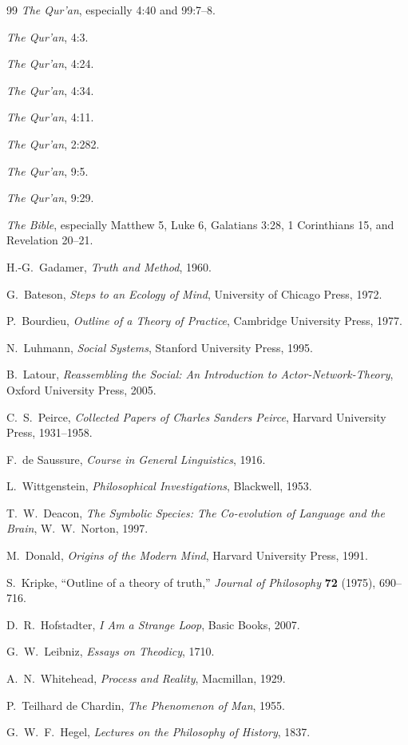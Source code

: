 \documentclass[11pt]{article}
\theoremstyle{remark}
\theoremstyle{plain}
\begin{document}
\begin{thebibliography}{99}
\emph{The Qur'an},
especially 4:40 and 99:7--8.

\emph{The Qur'an}, 4:3.

\emph{The Qur'an}, 4:24.

\emph{The Qur'an}, 4:34.

\emph{The Qur'an}, 4:11.

\emph{The Qur'an}, 2:282.

\emph{The Qur'an}, 9:5.

\emph{The Qur'an}, 9:29.

\emph{The Bible},
especially Matthew 5, Luke 6, Galatians 3:28, 1 Corinthians 15, and
Revelation 20--21.

H.-G.\ Gadamer,
\emph{Truth and Method},
1960.

G.\ Bateson,
\emph{Steps to an Ecology of Mind},
University of Chicago Press, 1972.

P.\ Bourdieu,
\emph{Outline of a Theory of Practice},
Cambridge University Press, 1977.

N.\ Luhmann,
\emph{Social Systems},
Stanford University Press, 1995.

B.\ Latour,
\emph{Reassembling the Social: An Introduction to Actor-Network-Theory},
Oxford University Press, 2005.

C.\ S.\ Peirce,
\emph{Collected Papers of Charles Sanders Peirce},
Harvard University Press, 1931--1958.

F.\ de Saussure,
\emph{Course in General Linguistics},
1916.

L.\ Wittgenstein,
\emph{Philosophical Investigations},
Blackwell, 1953.

T.\ W.\ Deacon,
\emph{The Symbolic Species: The Co-evolution of Language and the Brain},
W.\ W.\ Norton, 1997.

M.\ Donald,
\emph{Origins of the Modern Mind},
Harvard University Press, 1991.

S.\ Kripke,
``Outline of a theory of truth,''
\emph{Journal of Philosophy} \textbf{72} (1975), 690--716.

D.\ R.\ Hofstadter,
\emph{I Am a Strange Loop},
Basic Books, 2007.

G.\ W.\ Leibniz,
\emph{Essays on Theodicy},
1710.

A.\ N.\ Whitehead,
\emph{Process and Reality},
Macmillan, 1929.

P.\ Teilhard de Chardin,
\emph{The Phenomenon of Man},
1955.

G.\ W.\ F.\ Hegel,
\emph{Lectures on the Philosophy of History},
1837.

\end{thebibliography}
\end{document}
